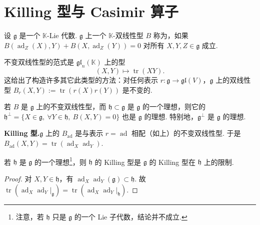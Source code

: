 \section{Killing 型与 Casimir 算子}\label{sec:lie-2-2}

\begin{definition}\label{def:lie-2-2-1}
设 $\mathfrak g$ 是一个 $\mathbb K$-Lie 代数. $\mathfrak g$ 上一个 $\mathbb K$-双线性型 $B$ 称为，如果 $B(\operatorname{ad}_Z(X),Y)+B(X,\operatorname{ad}_Z(Y))=0$ 对所有 $X,Y,Z\in\mathfrak g$ 成立.
\end{definition}

\begin{example*}
不变双线性型的范式是 $\mathfrak{gl}_n(\mathbb K)$ 上的型
\[
(X,Y)\mapsto\operatorname{tr}(XY).
\]
这给出了构造许多其它此类型的方法：对任何表示 $r:\mathfrak g\longrightarrow\mathfrak{gl}(V)$，$\mathfrak g$ 上的双线性型 $B_r(X,Y):=\operatorname{tr}(r(X)r(Y))$ 是不变的.
\end{example*}

\begin{proposition*}
若 $B$ 是 $\mathfrak g$ 上的不变双线性型，而 $\mathfrak h\subset\mathfrak g$ 是 $\mathfrak g$ 的一个理想，则它的 $\mathfrak h^{\perp}=\{X\in\mathfrak g,\ \forall Y\in\mathfrak h,\ B(X,Y)=0\}$ 也是 $\mathfrak g$ 的理想. 特别地，$\mathfrak g^{\perp}$ 是 $\mathfrak g$ 的理想.
\end{proposition*}

\noindent\textbf{Killing 型.}\quad $\mathfrak g$ 上的 $B_{\mathrm{ad}}$ 是与表示 $r=\operatorname{ad}$ 相配（如上）的不变双线性型. 于是 $B_{\mathrm{ad}}(X,Y)=\operatorname{tr}(\operatorname{ad}_X\operatorname{ad}_Y)$.

\begin{lemma}\label{lemma:lie-2-2-2}
若 $\mathfrak h$ 是 $\mathfrak g$ 的一个理想\footnote{注意，若 $\mathfrak h$ 只是 $\mathfrak g$ 的一个 Lie 子代数，结论并不成立.}，则 $\mathfrak h$ 的 Killing 型是 $\mathfrak g$ 的 Killing 型在 $\mathfrak h$ 上的限制.
\end{lemma}

\begin{proof}
对 $X,Y\in\mathfrak h$，有 $\operatorname{ad}_X\operatorname{ad}_Y(\mathfrak g)\subset\mathfrak h$. 故 $\operatorname{tr}(\operatorname{ad}_X\operatorname{ad}_Y|_{\mathfrak g})=\operatorname{tr}(\operatorname{ad}_X\operatorname{ad}_Y|_{\mathfrak h})$.
\end{proof}

